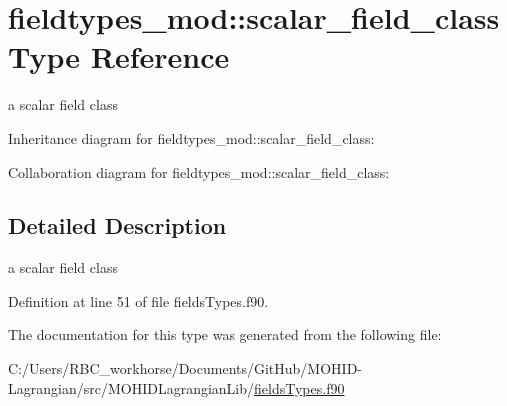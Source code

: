 \hypertarget{structfieldtypes__mod_1_1scalar__field__class}{}\section{fieldtypes\+\_\+mod\+:\+:scalar\+\_\+field\+\_\+class Type Reference}
\label{structfieldtypes__mod_1_1scalar__field__class}


a scalar field class  




Inheritance diagram for fieldtypes\+\_\+mod\+:\+:scalar\+\_\+field\+\_\+class\+:


Collaboration diagram for fieldtypes\+\_\+mod\+:\+:scalar\+\_\+field\+\_\+class\+:


\subsection{Detailed Description}
a scalar field class 

Definition at line 51 of file fields\+Types.\+f90.



The documentation for this type was generated from the following file\+:\begin{DoxyCompactItemize}
\item 
C\+:/\+Users/\+R\+B\+C\+\_\+workhorse/\+Documents/\+Git\+Hub/\+M\+O\+H\+I\+D-\/\+Lagrangian/src/\+M\+O\+H\+I\+D\+Lagrangian\+Lib/\mbox{\hyperlink{fields_types_8f90}{fields\+Types.\+f90}}\end{DoxyCompactItemize}
